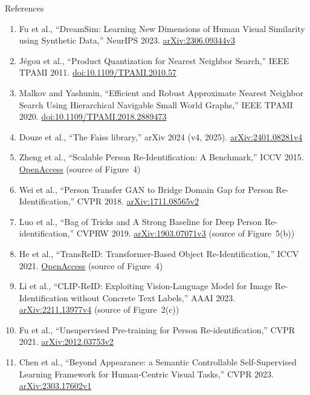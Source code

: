 \begin{frame}[allowframebreaks]{References}
\begin{enumerate}
    \item Fu et al., ``DreamSim: Learning New Dimensions of Human Visual Similarity using Synthetic Data,'' NeurIPS 2023. \href{https://arxiv.org/abs/2306.09344v3}{arXiv:2306.09344v3}
    \item J\'egou et al., ``Product Quantization for Nearest Neighbor Search,'' IEEE TPAMI 2011. \href{https://doi.org/10.1109/TPAMI.2010.57}{doi:10.1109/TPAMI.2010.57}
    \item Malkov and Yashunin, ``Efficient and Robust Approximate Nearest Neighbor Search Using Hierarchical Navigable Small World Graphs,'' IEEE TPAMI 2020. \href{https://doi.org/10.1109/TPAMI.2018.2889473}{doi:10.1109/TPAMI.2018.2889473}
    \item Douze et al., ``The Faiss library,'' arXiv 2024 (v4, 2025). \href{https://arxiv.org/abs/2401.08281v4}{arXiv:2401.08281v4}
    \item Zheng et al., ``Scalable Person Re-Identification: A Benchmark,'' ICCV 2015. \href{https://openaccess.thecvf.com/content_iccv_2015/html/Zheng_Scalable_Person_Re-Identification_ICCV_2015_paper.html}{OpenAccess} (source of Figure~4)
    \item Wei et al., ``Person Transfer GAN to Bridge Domain Gap for Person Re-Identification,'' CVPR 2018. \href{https://arxiv.org/abs/1711.08565v2}{arXiv:1711.08565v2}
    \item Luo et al., ``Bag of Tricks and A Strong Baseline for Deep Person Re-identification,'' CVPRW 2019. \href{https://arxiv.org/abs/1903.07071v3}{arXiv:1903.07071v3} (source of Figure~5(b))
    \item He et al., ``TransReID: Transformer-Based Object Re-Identification,'' ICCV 2021. \href{https://openaccess.thecvf.com/content/ICCV2021/html/He_TransReID_Transformer-Based_Object_Re-Identification_ICCV_2021_paper.html}{OpenAccess} (source of Figure~4)
    \item Li et al., ``CLIP-ReID: Exploiting Vision-Language Model for Image Re-Identification without Concrete Text Labels,'' AAAI 2023. \href{https://arxiv.org/abs/2211.13977v4}{arXiv:2211.13977v4} (source of Figure~2(c))
    \item Fu et al., ``Unsupervised Pre-training for Person Re-identification,'' CVPR 2021. \href{https://arxiv.org/abs/2012.03753v2}{arXiv:2012.03753v2}
    \item Chen et al., ``Beyond Appearance: a Semantic Controllable Self-Supervised Learning Framework for Human-Centric Visual Tasks,'' CVPR 2023. \href{https://arxiv.org/abs/2303.17602v1}{arXiv:2303.17602v1}

\end{enumerate}
\end{frame}
